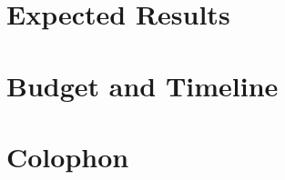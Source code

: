 \chapter{Expected Results}
	\Mprintcontents
	\label{ch:proposal}
	
	\stopcontents[chapters]
	\clearpage


\printbibliography

\clearpage

\appendix
\chapter{Budget and Timeline}
	

\backmatter
\chapter{Colophon}
	



